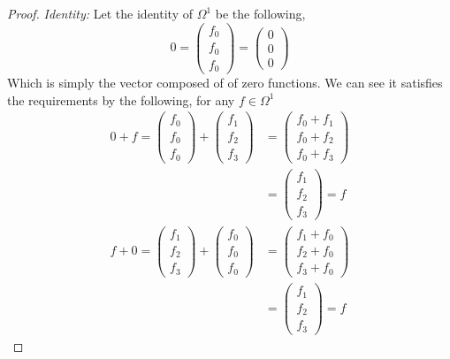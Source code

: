 \documentclass[12pt]{article}
\newcommand {\f}[1]{{#1_1 dx + #1_2 dy + #1_3 dz}}
\begin{document}
\begin{itemize}
\begin{itemize}
\begin{proof}
                \textit{Identity:} Let the identity of $\Omega^1$ be the following,
                \[0 = \begin{pmatrix}
                    f_0 \\f_0\\f_0
                \end{pmatrix} = \begin{pmatrix}
                    0\\0\\0
                \end{pmatrix}\] 
                \newpage
                Which is simply the vector composed of of zero functions. We can see it satisfies the requirements by the following, for any $f\in \Omega^1 $
                \begin{align*}
                    0 + f =\begin{pmatrix}
                        f_0 \\f_0 \\ f_0
                    \end{pmatrix} + \begin{pmatrix}
                        f_1 \\ f_2 \\f_3
                    \end{pmatrix} &= \begin{pmatrix}
                        f_0 + f_1 \\ f_0 + f_2 \\ f_0 + f_3
                    \end{pmatrix} \\
                    &= \begin{pmatrix}
                        f_1 \\ f_2\\ f_3
                    \end{pmatrix} = f \\
                    f+ 0 = \begin{pmatrix}
                        f_1 \\ f_2 \\f_3
                    \end{pmatrix} + \begin{pmatrix}
                        f_0 \\f_0 \\ f_0
                    \end{pmatrix} &=  \begin{pmatrix}
                        f_1 + f_0 \\ f_2 + f_0 \\ f_3 + f_0
                    \end{pmatrix} \\
                    &= \begin{pmatrix}
                        f_1 \\ f_2\\ f_3
                    \end{pmatrix} = f
                \end{align*}


\end{proof}
\end{itemize}
\end{itemize}
\end{document}
